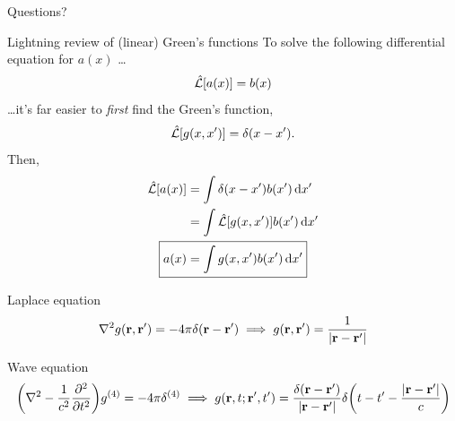 \documentclass[aspectratio=169]{beamer}
\begin{document}
\begin{frame}[standout]
  Questions?
\end{frame}

\appendix

\begin{frame}{Lightning review of (linear) Green's functions}
  To solve the following differential equation for $a(x)$ \ldots
  \begin{equation*}
    \hat{\mathcal{L}}\qty[a(x)] = b(x)
  \end{equation*}
  \ldots it's far easier to \emph{first} find the Green's function,
  \begin{equation*}
    \hat{\mathcal{L}}\qty[g(x, x')] = \delta(x - x').
  \end{equation*}
  Then,
  \begin{align*}
    \hat{\mathcal{L}}\qty[a(x)] &= \int \delta(x - x') b(x') \dd{x'} \\
                                &= \int \hat{\mathcal{L}}\qty[g(x, x')] b(x') \dd{x'} \\
                   \Aboxed{a(x) &= \int g(x, x') b(x') \dd{x'}}
  \end{align*}
\end{frame}

\begin{frame}
  \begin{block}{Laplace equation}
    \begin{equation*}
      \laplacian g(\vb{r}, \vb{r}') = -4 \pi \delta(\vb{r} - \vb{r}') \implies g(\vb{r}, \vb{r}') = \frac{1}{\abs{\vb{r} - \vb{r}'}}
    \end{equation*}
  \end{block}

  \begin{block}{Wave equation}
    \begin{equation*}
      \qty(\laplacian - \frac{1}{c^2}\pdv[2]{t}) g^{(4)} = -4 \pi \delta^{(4)} \implies g(\vb{r}, t; \vb{r}', t') = \frac{\delta(\vb{r} - \vb{r}')}{\abs{\vb{r} - \vb{r}'}} \delta\qty(t - t' - \frac{\abs{\vb{r} - \vb{r}'}}{c})
    \end{equation*}
  \end{block}
\end{frame}
\end{document}
